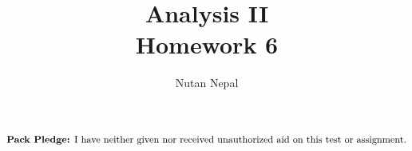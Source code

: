 \documentclass[12pt]{article}
\title{Analysis II \\
\large Homework 6
}
\author{Nutan Nepal}
\newcommand{\packpledge}{
    $\text{{\bf Pack Pledge:} I have neither given nor
    received unauthorized aid on this
    test or assignment.}$}
\begin{document}
\maketitle
\packpledge\\
\makebox[\linewidth]{\rule{200mm}{1pt}}
\vspace{1mm}


\newcommand{\mR}{\mathbb{R}}
\newcommand{\mM}{\mathcal{M}}
\newcommand{\mN}{\mathbb{N}}
\newcommand{\mC}{\mathbb{C}}
\newcommand{\mQ}{\mathbb{Q}}
\newcommand{\cP}{\mathcal{P}}
\newcommand{\cB}{\mathcal{B}}
\newcommand{\cM}{\mathcal{M}}
\newcommand{\ds}{\displaystyle}
\newcommand{\al}{\alpha}
\newcommand{\li}{l^{\infty}}
\newcommand{\ep}{\varepsilon}
\newcommand{\de}{\delta}
\newcommand{\T}{\mathcal{T}}
\newcommand{\linf}{l^{\infty}}
\newcommand{\cD}{\mathcal{D}}
\newcommand{\cR}{\mathcal{R}} 
\newcommand{\cN}{\mathcal{N}}
\newcommand{\cO}{\mathcal{O}}
\newcommand{\cL}{\mathcal{L}}
\newcommand{\lsn}{\limsup_{n \to \infty}}
\newcommand{\lin}{\liminf_{n \to \infty}}
\newcommand{\dmu}{\ d\mu}
\newcommand{\ix}{\int_X}
\newcommand{\soi}{\sum_{i=1}^{\infty}}
\newcommand{\son}{\sum_{i=1}^{n}}
\newcommand{\la}{\lambda}
\newcommand{\Lp}{L^p(\mu)}
\newcommand{\Lq}{L^q(\mu)}
\newcommand{\Lr}{L^r(\mu)}
\newcommand{\ms}{(X, \mM, \mu)}
\newcommand{\outm}{\mu^*}
\end{document}
